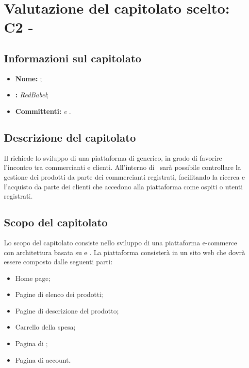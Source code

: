 \section{Valutazione del capitolato scelto: C2 - \NomeProgetto}\label{C2}
\subsection{Informazioni sul capitolato}
\begin{itemize}
	\item \textbf{Nome:} \textit{\NomeProgetto};
	\item \textbf{:} \textit{RedBabel};
	\item \textbf{Committenti:} \textit{\VT{} e \CR{}}.
\end{itemize}

\subsection{Descrizione del capitolato}
Il  richiede lo sviluppo di una piattaforma di  generico, in grado di favorire l'incontro tra commercianti e clienti. All'interno di \NomeProgetto\ sarà possibile controllare la gestione dei prodotti da parte dei commercianti registrati, facilitando la ricerca e l'acquisto da parte dei clienti che accedono alla piattaforma come ospiti o utenti registrati.

\subsection{Scopo del capitolato}
Lo scopo del capitolato consiste nello sviluppo di una piattaforma e-commerce con architettura basata su  e .
La piattaforma consisterà in un sito web che dovrà essere composto dalle seguenti parti:
\begin{itemize}
	\item Home page;
	\item Pagine di elenco dei prodotti;
	\item Pagine di descrizione del prodotto;
	\item Carrello della spesa;
	\item Pagina di ;
	\item Pagina di account.
\end{itemize}

